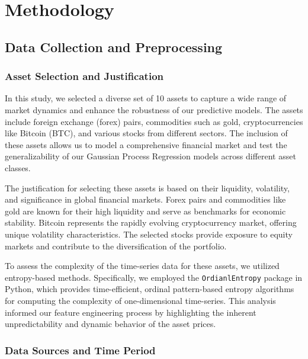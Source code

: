 
\chapter{Methodology}\label{chapter:methodology}

\section{Data Collection and Preprocessing}

\subsection{Asset Selection and Justification}

In this study, we selected a diverse set of 10 assets to capture a wide range of market dynamics and enhance the robustness of our predictive models. The assets include foreign exchange (forex) pairs, commodities such as gold, cryptocurrencies like Bitcoin (BTC), and various stocks from different sectors. The inclusion of these assets allows us to model a comprehensive financial market and test the generalizability of our Gaussian Process Regression models across different asset classes.

The justification for selecting these assets is based on their liquidity, volatility, and significance in global financial markets. Forex pairs and commodities like gold are known for their high liquidity and serve as benchmarks for economic stability. Bitcoin represents the rapidly evolving cryptocurrency market, offering unique volatility characteristics. The selected stocks provide exposure to equity markets and contribute to the diversification of the portfolio.

To assess the complexity of the time-series data for these assets, we utilized entropy-based methods. Specifically, we employed the \texttt{OrdianlEntropy} package in Python, which provides time-efficient, ordinal pattern-based entropy algorithms for computing the complexity of one-dimensional time-series. This analysis informed our feature engineering process by highlighting the inherent unpredictability and dynamic behavior of the asset prices.

\subsection{Data Sources and Time Period}


